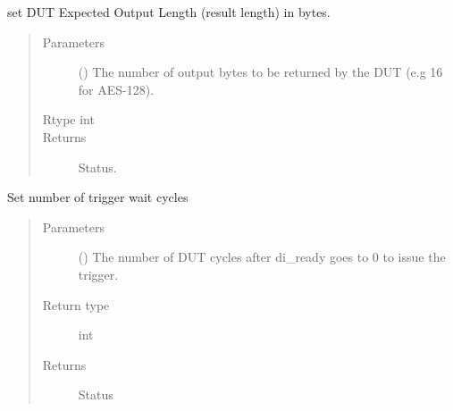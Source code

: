 \documentclass[letterpaper,10pt,english]{sphinxmanual}
\begin{document}
\begin{fulllineitems}
\begin{fulllineitems}
\begin{quote}
\begin{description}
\end{description}\end{quote}

\end{fulllineitems}


\begin{fulllineitems}
\label{\detokenize{reference_doc:fobos.Basys3Ctrl.setOutLen}}
set DUT Expected Output Length (result length) in bytes.
\begin{quote}\begin{description}
\item[{Parameters}] \leavevmode
{} () \textendash{} The number of output bytes to be returned by the DUT (e.g 16 for AES-128).

\item[{Rtype int}] \leavevmode
\item[{Returns}] \leavevmode
Status.

\end{description}\end{quote}

\end{fulllineitems}


\begin{fulllineitems}
\label{\detokenize{reference_doc:fobos.Basys3Ctrl.setTriggerWait}}
Set number of trigger wait cycles
\begin{quote}\begin{description}
\item[{Parameters}] \leavevmode
{} () \textendash{} The number of DUT cycles after di\_ready goes to 0 to issue the trigger.

\item[{Return type}] \leavevmode
int

\item[{Returns}] \leavevmode
Status


\end{description}
\end{quote}
\end{fulllineitems}
\end{fulllineitems}
\end{document}
